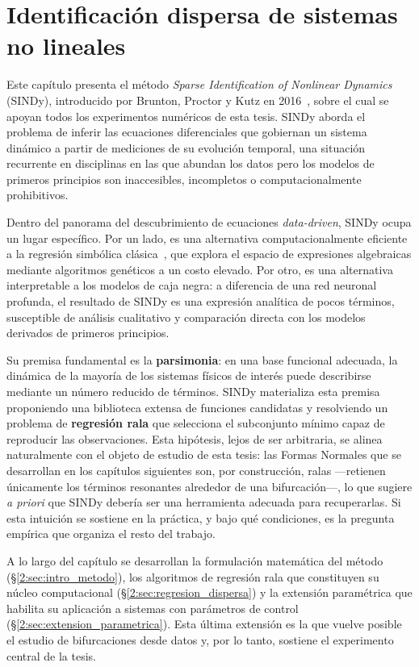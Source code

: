 \chapter{\textbf{Identificación dispersa de sistemas no lineales}}
\label{2:cap:identificacion_de_sistemas_no_lineales_mediante_representaciones_dispersas}

Este capítulo presenta el método \textit{Sparse Identification of Nonlinear Dynamics} (SINDy), introducido por Brunton, Proctor y Kutz en 2016~\cite{brunton2016pnas}, sobre el cual se apoyan todos los experimentos numéricos de esta tesis. SINDy aborda el problema de inferir las ecuaciones diferenciales que gobiernan un sistema dinámico a partir de mediciones de su evolución temporal, una situación recurrente en disciplinas en las que abundan los datos pero los modelos de primeros principios son inaccesibles, incompletos o computacionalmente prohibitivos.

Dentro del panorama del descubrimiento de ecuaciones \textit{data-driven}, SINDy ocupa un lugar específico. Por un lado, es una alternativa computacionalmente eficiente a la regresión simbólica clásica~\cite{schmidt2009eureqa}, que explora el espacio de expresiones algebraicas mediante algoritmos genéticos a un costo elevado. Por otro, es una alternativa interpretable a los modelos de caja negra: a diferencia de una red neuronal profunda, el resultado de SINDy es una expresión analítica de pocos términos, susceptible de análisis cualitativo y comparación directa con los modelos derivados de primeros principios.

Su premisa fundamental es la \textbf{parsimonia}: en una base funcional adecuada, la dinámica de la mayoría de los sistemas físicos de interés puede describirse mediante un número reducido de términos. SINDy materializa esta premisa proponiendo una biblioteca extensa de funciones candidatas y resolviendo un problema de \textbf{regresión rala} que selecciona el subconjunto mínimo capaz de reproducir las observaciones. Esta hipótesis, lejos de ser arbitraria, se alinea naturalmente con el objeto de estudio de esta tesis: las Formas Normales que se desarrollan en los capítulos siguientes son, por construcción, ralas —retienen únicamente los términos resonantes alrededor de una bifurcación—, lo que sugiere \textit{a priori} que SINDy debería ser una herramienta adecuada para recuperarlas. Si esta intuición se sostiene en la práctica, y bajo qué condiciones, es la pregunta empírica que organiza el resto del trabajo.

A lo largo del capítulo se desarrollan la formulación matemática del método (§\ref{2:sec:intro_metodo}), los algoritmos de regresión rala que constituyen su núcleo computacional (§\ref{2:sec:regresion_dispersa}) y la extensión paramétrica que habilita su aplicación a sistemas con parámetros de control (§\ref{2:sec:extension_parametrica}). Esta última extensión es la que vuelve posible el estudio de bifurcaciones desde datos y, por lo tanto, sostiene el experimento central de la tesis.

